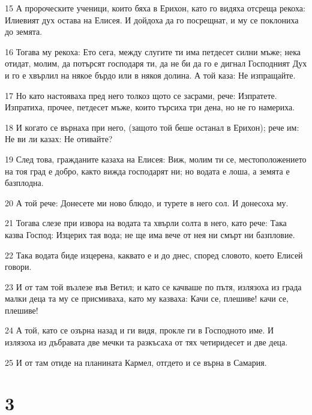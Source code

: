 \par 15 А пророческите ученици, които бяха в Ерихон, като го видяха отсреща рекоха: Илиевият дух остава на Елисея. И дойдоха да го посрещнат, и му се поклониха до земята.
\par 16 Тогава му рекоха: Ето сега, между слугите ти има петдесет силни мъже; нека отидат, молим, да потърсят господаря ти, да не би да го е дигнал Господният Дух и го е хвърлил на някое бърдо или в някоя долина. А той каза: Не изпращайте.
\par 17 Но като настояваха пред него толкоз щото се засрами, рече: Изпратете. Изпратиха, прочее, петдесет мъже, които търсиха три дена, но не го намериха.
\par 18 И когато се върнаха при него, (защото той беше останал в Ерихон); рече им: Не ви ли казах: Не отивайте?
\par 19 След това, гражданите казаха на Елисея: Виж, молим ти се, местоположението на тоя град е добро, както вижда господарят ни; но водата е лоша, а земята е базплодна.
\par 20 А той рече: Донесете ми ново блюдо, и турете в него сол. И донесоха му.
\par 21 Тогава слезе при извора на водата та хвърли солта в него, като рече: Така казва Господ: Изцерих тая вода; не ще има вече от нея ни смърт ни базпловие.
\par 22 Така водата биде изцерена, каквато е и до днес, според словото, което Елисей говори.
\par 23 И от там той възлезе във Ветил; и като се качваше по пътя, излязоха из града малки деца та му се присмиваха, като му казваха: Качи се, плешиве! качи се, плешиве!
\par 24 А той, като се озърна назад и ги видя, прокле ги в Господното име. И излязоха из дъбравата две мечки та разкъсаха от тях четиридесет и две деца.
\par 25 И от там отиде на планината Кармел, отгдето и се върна в Самария.

\chapter{3}

